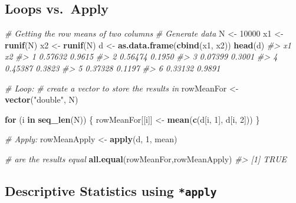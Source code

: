 \documentclass[]{book}
\makeatletter
\newenvironment{Shaded}{\begin{snugshade}}{\end{snugshade}}
\newcommand{\KeywordTok}[1]{\textcolor[rgb]{0.13,0.29,0.53}{\textbf{#1}}}
\newcommand{\DecValTok}[1]{\textcolor[rgb]{0.00,0.00,0.81}{#1}}
\newcommand{\StringTok}[1]{\textcolor[rgb]{0.31,0.60,0.02}{#1}}
\newcommand{\CommentTok}[1]{\textcolor[rgb]{0.56,0.35,0.01}{\textit{#1}}}
\newcommand{\ControlFlowTok}[1]{\textcolor[rgb]{0.13,0.29,0.53}{\textbf{#1}}}
\newcommand{\NormalTok}[1]{#1}
\newenvironment{kframe}{%
\medskip{}
\setlength{\fboxsep}{.8em}
 \def\at@end@of@kframe{}%
 \ifinner\ifhmode%
  \def\at@end@of@kframe{\end{minipage}}%
  \begin{minipage}{\columnwidth}%
 \fi\fi%
 \def\FrameCommand##1{\hskip\@totalleftmargin \hskip-\fboxsep
 \colorbox{shadecolor}{##1}\hskip-\fboxsep
     \hskip-\linewidth \hskip-\@totalleftmargin \hskip\columnwidth}%
 \MakeFramed {\advance\hsize-\width
   \@totalleftmargin\z@ \linewidth\hsize
   \@setminipage}}%
 {\par\unskip\endMakeFramed%
 \at@end@of@kframe}
\renewenvironment{Shaded}{\begin{kframe}}{\end{kframe}}
\theoremstyle{definition}
\theoremstyle{definition}
\theoremstyle{definition}
\theoremstyle{remark}
\makeatother
\begin{document}
\subsection{Loops vs.~Apply}\label{loops-vs.apply}

\begin{Shaded}
\begin{Highlighting}[]

\CommentTok{# Getting the row means of two columns}
\CommentTok{# Generate data}
\NormalTok{N <-}\StringTok{ }\DecValTok{10000}
\NormalTok{x1 <-}\StringTok{ }\KeywordTok{runif}\NormalTok{(N)}
\NormalTok{x2 <-}\StringTok{ }\KeywordTok{runif}\NormalTok{(N)}
\NormalTok{d <-}\StringTok{ }\KeywordTok{as.data.frame}\NormalTok{(}\KeywordTok{cbind}\NormalTok{(x1, x2))}
\KeywordTok{head}\NormalTok{(d)}
\CommentTok{#>        x1     x2}
\CommentTok{#> 1 0.57632 0.9615}
\CommentTok{#> 2 0.56474 0.1950}
\CommentTok{#> 3 0.07399 0.3001}
\CommentTok{#> 4 0.45387 0.3823}
\CommentTok{#> 5 0.37328 0.1197}
\CommentTok{#> 6 0.33132 0.9891}

\CommentTok{# Loop:}
\CommentTok{# create a vector to store the results in }
\NormalTok{rowMeanFor <-}\StringTok{ }\KeywordTok{vector}\NormalTok{(}\StringTok{"double"}\NormalTok{, N)}

\ControlFlowTok{for}\NormalTok{ (i }\ControlFlowTok{in} \KeywordTok{seq_len}\NormalTok{(N)) \{}
\NormalTok{        rowMeanFor[[i]] <-}\StringTok{ }\KeywordTok{mean}\NormalTok{(}\KeywordTok{c}\NormalTok{(d[i, }\DecValTok{1}\NormalTok{], d[i, }\DecValTok{2}\NormalTok{]))}
\NormalTok{\}}

\CommentTok{# Apply:}
\NormalTok{rowMeanApply <-}\StringTok{ }\KeywordTok{apply}\NormalTok{(d, }\DecValTok{1}\NormalTok{, mean)}

\CommentTok{# are the results equal}
\KeywordTok{all.equal}\NormalTok{(rowMeanFor,rowMeanApply)}
\CommentTok{#> [1] TRUE}
\end{Highlighting}
\end{Shaded}

\subsection{\texorpdfstring{Descriptive Statistics using
\texttt{*apply}}{Descriptive Statistics using *apply}}\label{descriptive-statistics-using-apply}
\end{document}
